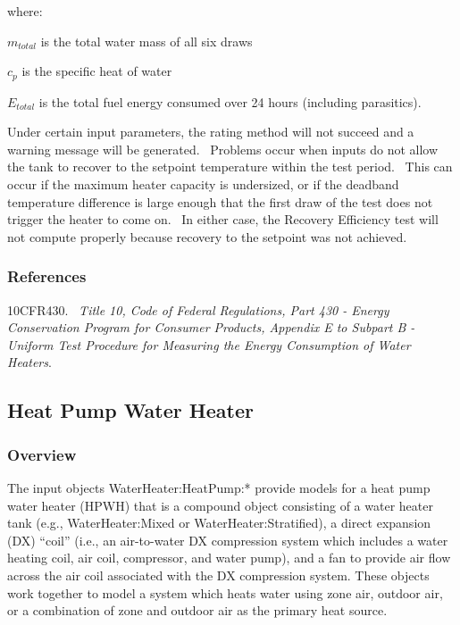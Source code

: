 where:

\(m_{total}\) is the total water mass of all six draws

\(c_{p}\) is the specific heat of water

\(E_{total}\) is the total fuel energy consumed over 24 hours (including parasitics).

Under certain input parameters, the rating method will not succeed and a warning message will be generated.~ Problems occur when inputs do not allow the tank to recover to the setpoint temperature within the test period.~ This can occur if the maximum heater capacity is undersized, or if the deadband temperature difference is large enough that the first draw of the test does not trigger the heater to come on.~ In either case, the Recovery Efficiency test will not compute properly because recovery to the setpoint was not achieved.

\subsubsection{References}\label{references-053}

10CFR430.~ \emph{Title 10, Code of Federal Regulations, Part 430 - Energy Conservation Program for Consumer Products, Appendix E to Subpart B - Uniform Test Procedure for Measuring the Energy Consumption of Water Heaters}.

\subsection{Heat Pump Water Heater}\label{heat-pump-water-heater}

\subsubsection{Overview}\label{overview-029}

The input objects WaterHeater:HeatPump:* provide models for a heat pump water heater (HPWH) that is a compound object consisting of a water heater tank (e.g., WaterHeater:Mixed or WaterHeater:Stratified), a direct expansion (DX) ``coil'' (i.e., an air-to-water DX compression system which includes a water heating coil, air coil, compressor, and water pump), and a fan to provide air flow across the air coil associated with the DX compression system. These objects work together to model a system which heats water using zone air, outdoor air, or a combination of zone and outdoor air as the primary heat source.

